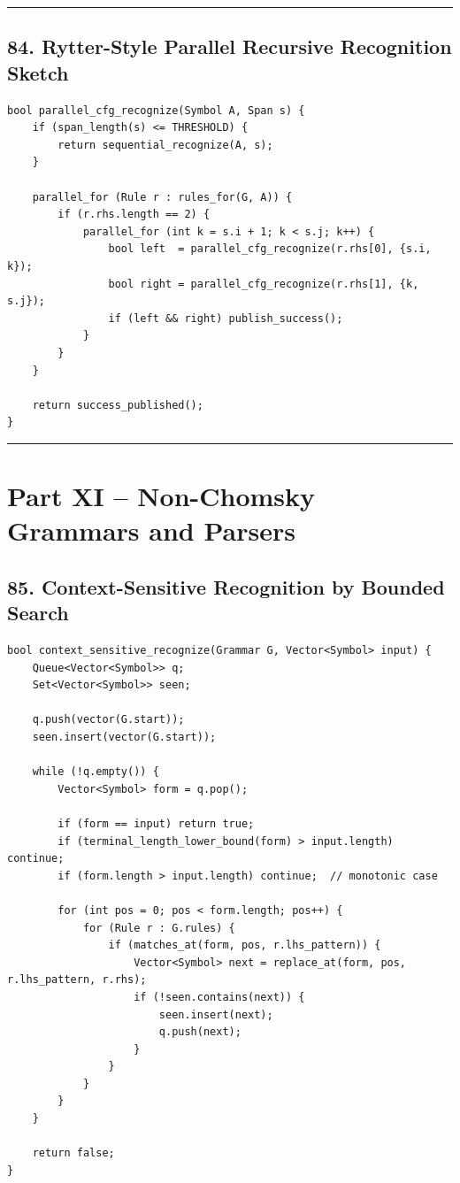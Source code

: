 \documentclass[10pt,letterpaper]{article}
\begin{document}
\medskip\hrule\medskip

\subsection*{84. Rytter-Style Parallel Recursive Recognition Sketch}

\begin{verbatim}
bool parallel_cfg_recognize(Symbol A, Span s) {
    if (span_length(s) <= THRESHOLD) {
        return sequential_recognize(A, s);
    }

    parallel_for (Rule r : rules_for(G, A)) {
        if (r.rhs.length == 2) {
            parallel_for (int k = s.i + 1; k < s.j; k++) {
                bool left  = parallel_cfg_recognize(r.rhs[0], {s.i, k});
                bool right = parallel_cfg_recognize(r.rhs[1], {k, s.j});
                if (left && right) publish_success();
            }
        }
    }

    return success_published();
}
\end{verbatim}

\medskip\hrule\medskip

\clearpage
\section*{Part XI -- Non-Chomsky Grammars and Parsers}

\subsection*{85. Context-Sensitive Recognition by Bounded Search}

\begin{verbatim}
bool context_sensitive_recognize(Grammar G, Vector<Symbol> input) {
    Queue<Vector<Symbol>> q;
    Set<Vector<Symbol>> seen;

    q.push(vector(G.start));
    seen.insert(vector(G.start));

    while (!q.empty()) {
        Vector<Symbol> form = q.pop();

        if (form == input) return true;
        if (terminal_length_lower_bound(form) > input.length) continue;
        if (form.length > input.length) continue;  // monotonic case

        for (int pos = 0; pos < form.length; pos++) {
            for (Rule r : G.rules) {
                if (matches_at(form, pos, r.lhs_pattern)) {
                    Vector<Symbol> next = replace_at(form, pos, r.lhs_pattern, r.rhs);
                    if (!seen.contains(next)) {
                        seen.insert(next);
                        q.push(next);
                    }
                }
            }
        }
    }

    return false;
}
\end{verbatim}
\end{document}
